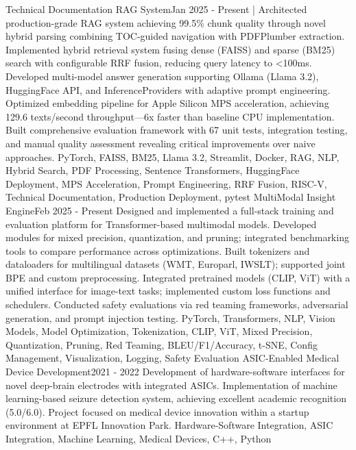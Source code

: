 %
%
%

\vspace*{-5mm}
\begin{projects}
\project
{Technical Documentation RAG System}{Jan 2025 - Present}
{ | }
{Architected production-grade RAG system achieving 99.5\% chunk quality through novel hybrid parsing combining TOC-guided navigation with PDFPlumber extraction.
Implemented hybrid retrieval system fusing dense (FAISS) and sparse (BM25) search with configurable RRF fusion, reducing query latency to <100ms.
Developed multi-model answer generation supporting Ollama (Llama 3.2), HuggingFace API, and InferenceProviders with adaptive prompt engineering.
Optimized embedding pipeline for Apple Silicon MPS acceleration, achieving 129.6 texts/second throughput—6x faster than baseline CPU implementation.
Built comprehensive evaluation framework with 67 unit tests, integration testing, and manual quality assessment revealing critical improvements over naive approaches.}
{PyTorch, FAISS, BM25, Llama 3.2, Streamlit, Docker, RAG, NLP, Hybrid Search, PDF Processing, Sentence Transformers, HuggingFace Deployment, MPS Acceleration, Prompt Engineering, RRF Fusion, RISC-V, Technical Documentation, Production Deployment, pytest}
\project
{MultiModal Insight Engine}{Feb 2025 - Present}
{}
{Designed and implemented a full-stack training and evaluation platform for Transformer-based multimodal models.
Developed modules for mixed precision, quantization, and pruning; integrated benchmarking tools to compare performance across optimizations.
Built tokenizers and dataloaders for multilingual datasets (WMT, Europarl, IWSLT); supported joint BPE and custom preprocessing.
Integrated pretrained models (CLIP, ViT) with a unified interface for image-text tasks; implemented custom loss functions and schedulers.
Conducted safety evaluations via red teaming frameworks, adversarial generation, and prompt injection testing.}
{PyTorch, Transformers, NLP, Vision Models, Model Optimization, Tokenization, CLIP, ViT, Mixed Precision, Quantization, Pruning, Red Teaming, BLEU/F1/Accuracy, t-SNE, Config Management, Visualization, Logging, Safety Evaluation}
\newpage
\project
{ASIC-Enabled Medical Device Development}{2021 - 2022}
{}
{Development of hardware-software interfaces for novel deep-brain electrodes with integrated ASICs. Implementation of machine learning-based seizure detection system, achieving excellent academic recognition (5.0/6.0). Project focused on medical device innovation within a startup environment at EPFL Innovation Park.}
{Hardware-Software Integration, ASIC Integration, Machine Learning, Medical Devices, C++, Python}


\end{projects}
